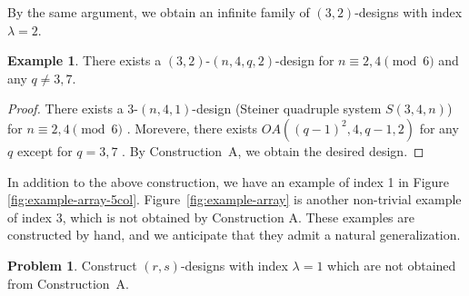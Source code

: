 \documentclass[a4paper, 11pt]{article}
\theoremstyle{definition}
\newtheorem{problem}[theorem]{Problem}
\newtheorem{example}[theorem]{Example}
\begin{document}
By the same argument, we obtain an infinite family of $(3,2)$-designs with index $\lambda=2$. 
\begin{example}
    There exists a $(3,2)$-$(n,4,q,2)$-design for $n \equiv 2,4 \pmod{6}$ and any $q\ne 3,7$.  
\end{example}
\begin{proof}
There exists a $3$-$(n,4,1)$-design (Steiner quadruple system $S(3,4,n)$) for $n \equiv 2,4 \pmod{6}$ \cite{ColbournMathon07}. 
Morevere, there exists $OA((q-1)^2, 4, q-1, 2)$ for any $q$ except for $q=3,7$ \cite{BSP60,HSS99}. By Construction~A, we obtain the desired design. 
\end{proof}


In addition to the above construction, we have an example of index 1 in Figure \ref{fig:example-array-5col}. 
Figure~\ref{fig:example-array} is another non-trivial example of index 3, which is not obtained by Construction A. 
These examples are constructed by hand, and we anticipate that they admit a natural generalization. 
\begin{problem}
    Construct $(r,s)$-designs with index $\lambda=1$ which are not obtained from Construction~A. 
\end{problem}
\end{document}
